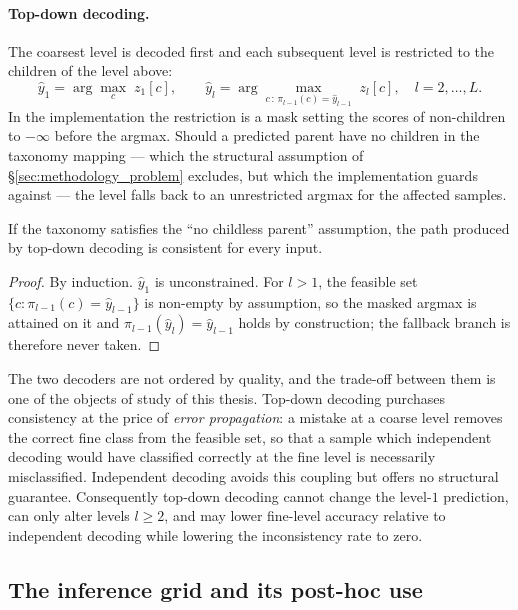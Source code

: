 \paragraph{Top-down decoding.} The coarsest level is decoded first and each
subsequent level is restricted to the children of the level above:
\[
\hat y_1=\arg\max_{c}\;z_1[c],
\qquad
\hat y_{l}=\arg\max_{c\,:\,\pi_{l-1}(c)=\hat y_{l-1}}\; z_{l}[c],
\quad l=2,\dots,L .
\]
In the implementation the restriction is a mask setting the scores of
non-children to $-\infty$ before the argmax. Should a predicted parent have no
children in the taxonomy mapping --- which the structural assumption of
\S\ref{sec:methodology_problem} excludes, but which the implementation guards
against --- the level falls back to an unrestricted argmax for the affected
samples.

\begin{proposition}
\label{prop:topdown_consistency}
If the taxonomy satisfies the ``no childless parent'' assumption, the path
produced by top-down decoding is consistent for every input.
\end{proposition}
\begin{proof}
By induction. $\hat y_1$ is unconstrained. For $l>1$, the feasible set
$\{c:\pi_{l-1}(c)=\hat y_{l-1}\}$ is non-empty by assumption, so the masked argmax
is attained on it and $\pi_{l-1}(\hat y_l)=\hat y_{l-1}$ holds by construction; the
fallback branch is therefore never taken.
\end{proof}

The two decoders are not ordered by quality, and the trade-off between them is one
of the objects of study of this thesis. Top-down decoding purchases consistency at
the price of \emph{error propagation}: a mistake at a coarse level removes the
correct fine class from the feasible set, so that a sample which independent
decoding would have classified correctly at the fine level is necessarily
misclassified. Independent decoding avoids this coupling but offers no structural
guarantee. Consequently top-down decoding cannot change the level-$1$ prediction,
can only alter levels $l\ge2$, and may lower fine-level accuracy relative to
independent decoding while lowering the inconsistency rate to zero.

\subsection{The inference grid and its post-hoc use}
\label{ssec:inference_grid}

